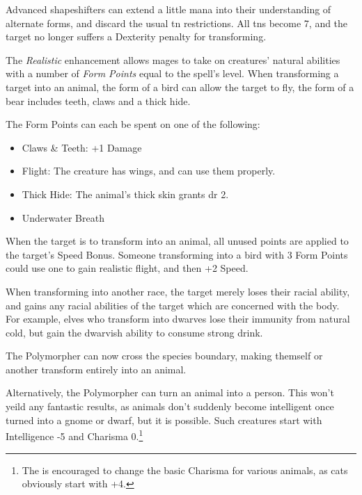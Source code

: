 \begin{multicols}{2}
{}


Advanced shapeshifters can extend a little mana into their understanding of alternate forms, and discard the usual \gls{tn} restrictions.  All \glspl{tn} become 7, and the target no longer suffers a Dexterity penalty for transforming.


The \textit{Realistic} enhancement allows mages to take on creatures' natural abilities with a number of \textit{Form Points} equal to the spell's level.  When transforming a target into an animal, the form of a bird can allow the target to fly, the form of a bear includes teeth, claws and a thick hide.

The Form Points can each be spent on one of the following:

\begin{itemize}

	\item{Claws \& Teeth: +1 Damage}
	\item{Flight: The creature has wings, and can use them properly.}
	\item{Thick Hide: The animal's thick skin grants \gls{dr} 2.}
	\item{Underwater Breath}

\end{itemize}

When the target is to transform into an animal, all unused points are applied to the target's Speed Bonus.  Someone transforming into a bird with 3 Form Points could use one to gain realistic flight, and then +2 Speed.

When transforming into another race, the target merely loses their racial ability, and gains any racial abilities of the target which are concerned with the body.  For example, elves who transform into dwarves lose their immunity from natural cold, but gain the dwarvish ability to consume strong drink.


The Polymorpher can now cross the species boundary, making themself or another transform entirely into an animal.

Alternatively, the Polymorpher can turn an animal into a person.
This won't yeild any fantastic results, as animals don't suddenly become intelligent once turned into a gnome or dwarf, but it is possible.
Such creatures start with Intelligence -5 and Charisma 0.\footnote{The  is encouraged to change the basic Charisma for various animals, as cats obviously start with +4.}


\end{multicols}
